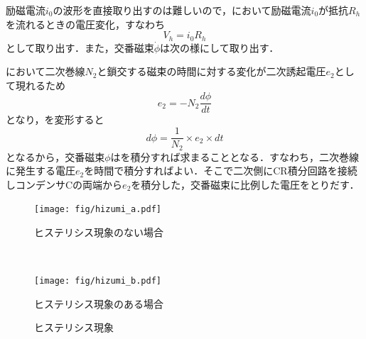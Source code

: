 励磁電流$i_0$の波形を直接取り出すのは難しいので，において励磁電流$i_0$が抵抗$R_h$を流れるときの電圧変化，すなわち
\begin{equation}
	V_h = i_0R_h
\end{equation}
として取り出す．また，交番磁束$\dot{\phi}$は次の様にして取り出す．

において二次巻線$N_2$と鎖交する磁束の時間に対する変化が二次誘起電圧$e_2$として現れるため
\begin{equation}
	e_2 = -N_2\frac{d \phi}{dt}
	\label{eq:hys:e2}
\end{equation}
となり，を変形すると
\begin{equation}
	d \phi = \frac{1}{N_2}\times e_2\times dt
	\label{eq:hys:dphi}
\end{equation}
となるから，交番磁束$\phi$はを積分すれば求まることとなる．すなわち，二次巻線に発生する電圧$e_2$を時間で積分すればよい．そこで二次側にCR積分回路を接続しコンデンサCの両端から$e_2$を積分した，交番磁束に比例した電圧をとりだす．

\begin{figure}[h]
  \begin{minipage}[c]{0.5\hsize}
    \centering
    \texttt{[image: fig/hizumi\_a.pdf]} 
    \caption{ヒステリシス現象のない場合}
  \end{minipage}\\
  \begin{minipage}[c]{0.5\hsize}
    \centering
    \texttt{[image: fig/hizumi\_b.pdf]}
    \caption{ヒステリシス現象のある場合}
  \end{minipage}
  \centering
  \caption{ヒステリシス現象}
   \label{fig:hys:hizumi}
\end{figure}

